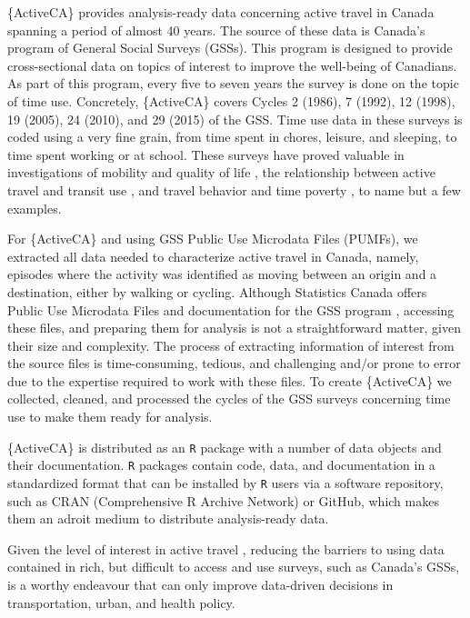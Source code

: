 \documentclass[Royal,times,sageh]{sagej}
\begin{document}
\{ActiveCA\} provides analysis-ready data concerning active travel in
Canada spanning a period of almost 40 years. The source of these data is
Canada's program of General Social Surveys (GSSs). This program is
designed to provide cross-sectional data on topics of interest to
improve the well-being of Canadians. As part of this program, every five
to seven years the survey is done on the topic of time use. Concretely,
\{ActiveCA\} covers Cycles 2 (1986), 7 (1992), 12 (1998), 19 (2005), 24
(2010), and 29 (2015) of the GSS. Time use data in these surveys is
coded using a very fine grain, from time spent in chores, leisure, and
sleeping, to time spent working or at school. These surveys have proved
valuable in investigations of mobility and quality of life
\citep{spinneyTransport2009}, the relationship between active travel and
transit use \citep{lachapelleLonger2016}, and travel behavior and time
poverty \citep{kimFacing2024}, to name but a few examples.

For \{ActiveCA\} and using GSS Public Use Microdata Files (PUMFs), we
extracted all data needed to characterize active travel in Canada,
namely, episodes where the activity was identified as moving between an
origin and a destination, either by walking or cycling. Although
Statistics Canada offers Public Use Microdata Files and documentation
for the GSS program \citep[see][]{statisticscanada2024}, accessing these
files, and preparing them for analysis is not a straightforward matter,
given their size and complexity. The process of extracting information
of interest from the source files is time-consuming, tedious, and
challenging and/or prone to error due to the expertise required to work
with these files. To create \{ActiveCA\} we collected, cleaned, and
processed the cycles of the GSS surveys concerning time use to make them
ready for analysis.

\{ActiveCA\} is distributed as an \texttt{R} package with a number of
data objects and their documentation. \texttt{R} packages contain code,
data, and documentation in a standardized format that can be installed
by \texttt{R} users via a software repository, such as CRAN
(Comprehensive R Archive Network) or GitHub, which makes them an adroit
medium to distribute analysis-ready data.

Given the level of interest in active travel
\citep[e.g.,][]{mccurdySupport2023}, reducing the barriers to using data
contained in rich, but difficult to access and use surveys, such as
Canada's GSSs, is a worthy endeavour that can only improve data-driven
decisions in transportation, urban, and health policy.
\end{document}
